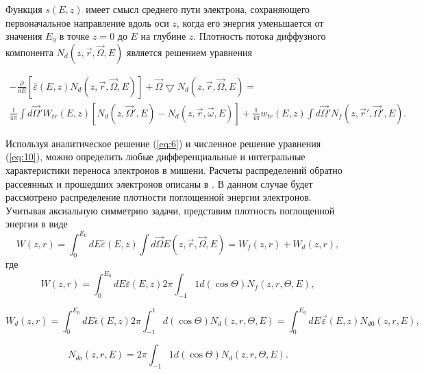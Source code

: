 Функция $s(E, z)$ имеет смысл среднего пути электрона, сохраняющего первоначальное
направление вдоль оси $z$, когда его энергия уменьшается от значения $E_0$ в точке $z=0$ до $E$
на глубине $z$.
Плотность потока диффузного компонента $N_d(z,\vec{r},\vec{\Omega},E)$ является решением
уравнения \cite{smolar}

\begin{gather}
-\frac{\partial}{\partial E}[\bar{\varepsilon}(E,z)N_d(z,\vec{r},\vec{\Omega},E)]+\vec{\Omega} \bigtriangledown N_d (z,\vec{r},\vec{\Omega},E)= \nonumber \\
\frac{1}{4\pi} \int d\vec{\Omega}'W_{tr}(E,z)[N_d(z,\vec{\Omega}',E)-N_d(z,\vec{r},\vec{\omega},E)]+\frac{1}{4\pi}w_{tr}(E,z) \int d\vec{\Omega}'N_f(z,\vec{r}',\vec{\Omega}',E).
\label{eq:10}
\end{gather}

Используя аналитическое решение (\ref{eq:6}) и численное решение уравнения (\ref{eq:10}), 
можно определить любые дифференциальные и интегральные характеристики переноса
электронов в мишени. Расчеты распределений обратно рассеянных и прошедших
электронов описаны в \cite{smolar}. В данном случае будет рассмотрено распределение
плотности поглощенной энергии электронов.
Учитывая аксиальную симметрию задачи, представим плотность поглощенной
энергии в виде
\begin{equation}
W(z,r)=\int_{0}^{E_0} dE\bar{\varepsilon}(E,z) \int d\vec{\Omega}E(z,\vec{r},\vec{\Omega},E)=W_f(z,r)+W_d(z,r),
\label{eq:11}
\end{equation}
где
\begin{equation}
W(z,r)=\int_{0}^{E_0} dE\bar{\varepsilon}(E,z)2\pi \int_{-1}{1} d(\cos \Theta)N_f(z,r,\Theta ,E),
\label{eq:12}
\end{equation}

\begin{equation}
W_{d}(z,r)=\int_{0}^{E_0} dE\bar{\epsilon}(E,z)2\pi \int_{-1}^{1} d(\cos \Theta)N_d(z,r,\Theta ,E)=\int_{0}^{E_0}dE\vec{\varepsilon}(E,z)N_{d0}(z,r,E),
\label{eq:13}
\end{equation}

\begin{equation}
N_{do}(z,r,E)=2\pi \int_{-1}{1} d(\cos \Theta)N_d(z,r,\Theta,E).
\label{eq:14}
\end{equation}

